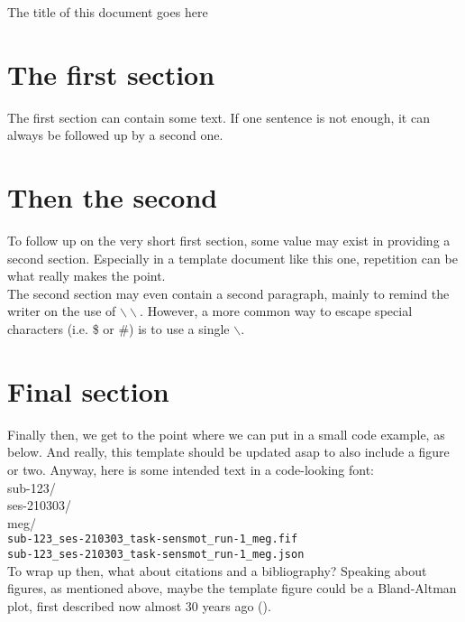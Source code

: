 \documentclass[12pt]{article} %
\newcommand\tab[1][1.5cm]{\hspace*{#1}} %
\begin{document}
\begin{center}
\LARGE{The title of this document goes here}
\end{center}

\vspace{5mm} %

\section*{The first section} %
The first section can contain some text. If one sentence is not enough, it can always be followed up by a second one.\\

\section*{Then the second}
To follow up on the very short first section, some value may exist in providing a second section. Especially in a template document like this one, repetition can be what really makes the point. \\

The second section may even contain a second paragraph, mainly to remind the writer on the use of $\backslash\backslash$. However, a more common way to escape special characters (i.e. \$ or \#) is to use a single $\backslash$. \\

\section*{Final section}
Finally then, we get to the point where we can put in a small code example, as below. And really, this template should be updated asap to also include a figure or two. Anyway, here is some intended text in a code-looking font:\\

{\selectfont
sub-123/ \\
\tab ses-210303/ \\
\tab \tab meg/ \\
\tab \tab \verb|sub-123_ses-210303_task-sensmot_run-1_meg.fif| \\
\tab \tab \verb|sub-123_ses-210303_task-sensmot_run-1_meg.json| 
}\\

To wrap up then, what about citations and a bibliography? Speaking about figures, as mentioned above, maybe the template figure could be a Bland-Altman plot, first described now almost 30 years ago (\cite{altman_measurement_1983}).

\break %

\printbibliography %
\end{document}
